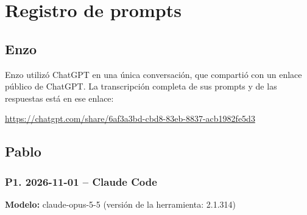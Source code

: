 \documentclass[11pt,a4paper]{article}
\begin{document}
\section{Registro de prompts}

\subsection{Enzo}
Enzo utilizó ChatGPT en una única conversación, que compartió con un enlace público de ChatGPT. La
transcripción completa de sus prompts y de las respuestas está en ese enlace:

\url{https://chatgpt.com/share/6af3a3bd-cbd8-83eb-8837-acb1982fe5d3}

\subsection{Pablo}\label{sec:pablo}
\subsubsection*{P1. 2026-11-01 -- Claude Code}
\textbf{Modelo:} claude-opus-5-5 (versión de la herramienta: 2.1.314)
\end{document}
